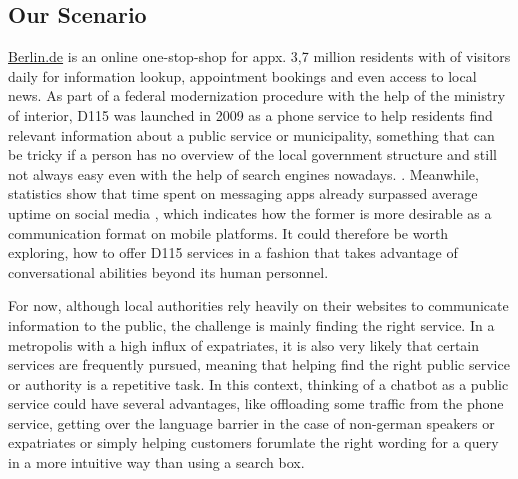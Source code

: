 \subsection{Our Scenario}
\href{https://www.berlin.de}{Berlin.de} is an online one-stop-shop for appx. 3,7 million residents \cite{zensus} with  of visitors daily for information lookup, appointment bookings and even access to local news. As part of a federal modernization procedure with the help of the ministry of interior, D115 was launched in 2009 \cite{d115} as a phone service to help residents find relevant information about a public service or municipality, something that can be tricky if a person has no overview of the local government structure and still not always easy even with the help of search engines nowadays.
.
Meanwhile, statistics \cite{businsider} show that time spent on messaging apps already surpassed average uptime on social media , which indicates how the former is more desirable as a communication format on mobile platforms. It could therefore be worth exploring, how to offer D115 services in a fashion that takes advantage of conversational abilities beyond its human personnel. 

For now, although local authorities rely heavily on their websites to communicate information to the public, the challenge is mainly finding the right service. In a metropolis with a high influx of expatriates, it is also very likely that certain services are frequently pursued, meaning that helping find the right public service or authority is a repetitive task. In this context, thinking of a chatbot as a public service could have several advantages, like offloading some traffic from the phone service, getting over the language barrier in the case of non-german speakers or expatriates or simply helping customers forumlate the right wording for a query in a more intuitive way than using a search box. 




